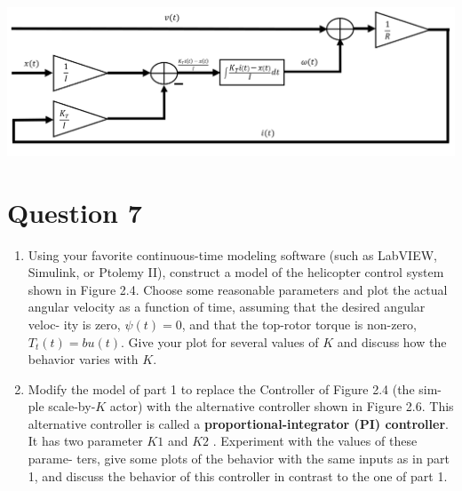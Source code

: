 \documentclass[12pt]{article}
\begin{document}
\begin{qsolve}[Solution]
	
	\centering\includegraphics*[width=1\linewidth]{images/img4}
\end{qsolve}
\vfil
\clearpage






















\section{Question 7}


\begin{enumerate}
	\item Using your favorite continuous-time modeling software (such as LabVIEW,
	Simulink, or Ptolemy II), construct a model of the helicopter control system
	shown in Figure 2.4. Choose some reasonable parameters and plot the actual
	angular velocity as a function of time, assuming that the desired angular veloc-
	ity is zero, $\psi(t)=0$, and that the top-rotor torque is non-zero, $T_t(t) = bu(t)$.
	Give your plot for several values of $K$ and discuss how the behavior varies
	with $K$.
	
	\item Modify the model of part 1 to replace the Controller of Figure 2.4 (the sim-
	ple scale-by-$K$ actor) with the alternative controller shown in Figure 2.6. This alternative controller is called a \textbf{proportional-integrator (PI) controller}. It
	has two parameter $K1$ and $K2$ . Experiment with the values of these parame-
	ters, give some plots of the behavior with the same inputs as in part 1, and
	discuss the behavior of this controller in contrast to the one of part 1.
\end{enumerate}
\end{document}
